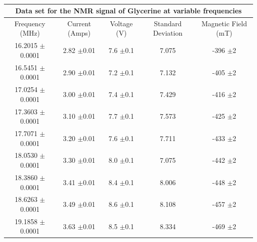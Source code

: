 \documentclass[12pt]{article}
\begin{document}
\begin{table}[H]
\begin{center}
 \footnotesize
 \begin{tabular}{|c||c||c||c||c|}
 \hline
 \multicolumn{5}{|c|}{Data set for the NMR signal of Glycerine at variable frequencies} \\
 \hline
 Frequency (MHz)  & Current (Amps)  & Voltage (V) & Standard Deviation & Magnetic Field (mT)\\
 \hline \hline
 16.2015 $\pm$0.0001  & 2.82 $\pm$0.01  & 7.6 $\pm$0.1 & 7.075 &  -396 $\pm$2 \\
 \hline
 16.5451 $\pm$0.0001  & 2.90 $\pm$0.01  & 7.2 $\pm$0.1 & 7.132 &  -405 $\pm$2 \\
 \hline
 17.0254 $\pm$0.0001  & 3.00 $\pm$0.01  & 7.4 $\pm$0.1 & 7.429 &  -416 $\pm$2 \\
 \hline
 17.3603 $\pm$0.0001  & 3.10 $\pm$0.01  & 7.7 $\pm$0.1 & 7.573 &  -425 $\pm$2 \\
 \hline
 17.7071 $\pm$0.0001  & 3.20 $\pm$0.01  & 7.6 $\pm$0.1 & 7.711 &  -433 $\pm$2 \\
 \hline
 18.0530 $\pm$0.0001  & 3.30 $\pm$0.01  & 8.0 $\pm$0.1 & 7.075 &  -442 $\pm$2 \\
 \hline
 18.3860 $\pm$0.0001  & 3.41 $\pm$0.01  & 8.4 $\pm$0.1 & 8.006 &  -448 $\pm$2 \\
 \hline
 18.6263 $\pm$0.0001  & 3.49 $\pm$0.01  & 8.6 $\pm$0.1 & 8.108 &  -457 $\pm$2 \\
 \hline
 19.1858 $\pm$0.0001  & 3.63 $\pm$0.01  & 8.5 $\pm$0.1 & 8.334 &  -469 $\pm$2 \\
 \hline
 \end{tabular} \\ 
 \caption{}
 \label{Gly NMR Spec}
\end{center}
\end{table}
\end{document}
